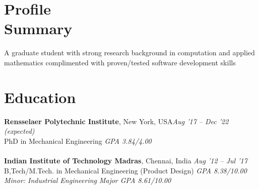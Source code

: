 \documentclass[margin,line]{res}
\begin{document}


\begin{resume}
\section{\sc Profile \\Summary}
A graduate student with strong research background in
computation and applied mathematics complimented
with proven/tested software development skills 

\section{\sc Education}
{\bf Rensselaer Polytechnic Institute}, New York, USA\hfill {\em Aug '17 -- Dec '22 (expected)}\\
PhD in Mechanical Engineering \hfill{\em GPA 3.84/4.00}\\\\
{\bf Indian Institute of Technology Madras}, Chennai, India \hfill {\em Aug '12 -- Jul '17}\\
B,Tech/M.Tech. in Mechanical Engineering (Product Design) \hfill{\em GPA 8.38/10.00}\\
{\em Minor: Industrial Engineering} \hfill {\em Major GPA 8.61/10.00}


\end{resume}
\end{document}
